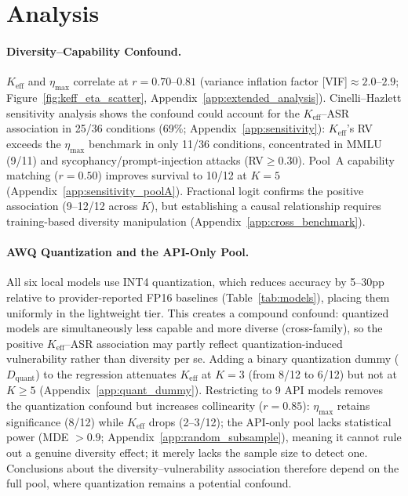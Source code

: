 \section{Analysis}
\label{sec:analysis}

\paragraph{Diversity--Capability Confound.}
$K_{\mathrm{eff}}$ and $\eta_{\max}$ correlate at $r{=}0.70$--$0.81$ (variance inflation factor [VIF]${\approx}2.0$--$2.9$; Figure~\ref{fig:keff_eta_scatter}, Appendix~\ref{app:extended_analysis}). Cinelli--Hazlett sensitivity analysis \citep{cinelli2020making} shows the confound could account for the $K_{\mathrm{eff}}$--ASR association in 25/36 conditions (69\%; Appendix~\ref{app:sensitivity}): $K_{\mathrm{eff}}$'s RV exceeds the $\eta_{\max}$ benchmark in only 11/36 conditions, concentrated in MMLU (9/11) and sycophancy/prompt-injection attacks (RV${\geq}0.30$). Pool~A capability matching ($r{=}0.50$) improves survival to 10/12 at $K{=}5$ (Appendix~\ref{app:sensitivity_poolA}). Fractional logit confirms the positive association (9--12/12 across $K$), but establishing a causal relationship requires training-based diversity manipulation (Appendix~\ref{app:cross_benchmark}).

\paragraph{AWQ Quantization and the API-Only Pool.}
All six local models use INT4 quantization, which reduces accuracy by 5--30pp relative to provider-reported FP16 baselines (Table~\ref{tab:models}), placing them uniformly in the lightweight tier. This creates a compound confound: quantized models are simultaneously less capable and more diverse (cross-family), so the positive $K_{\mathrm{eff}}$--ASR association may partly reflect quantization-induced vulnerability rather than diversity per se. Adding a binary quantization dummy ($D_{\mathrm{quant}}$) to the regression attenuates $K_{\mathrm{eff}}$ at $K{=}3$ (from 8/12 to 6/12) but not at $K{\geq}5$ (Appendix~\ref{app:quant_dummy}). Restricting to 9 API models removes the quantization confound but increases collinearity ($r{=}0.85$): $\eta_{\max}$ retains significance (8/12) while $K_{\mathrm{eff}}$ drops (2--3/12); the API-only pool lacks statistical power (MDE $> 0.9$; Appendix~\ref{app:random_subsample}), meaning it cannot rule out a genuine diversity effect; it merely lacks the sample size to detect one. Conclusions about the diversity--vulnerability association therefore depend on the full pool, where quantization remains a potential confound.


